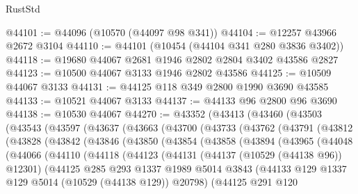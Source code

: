 \begin{lexlean}{RustStd}
\begin{coremodule}
@44101 := @44096 (@10570 (@44097 @98 @341))
@44104 := @12257 @43966 @2672 @3104
@44110 := @44101 (@10454 (@44104 @341 @280 @3836 @3402))
@44118 := @19680 @44067 @2681 @1946 @2802 @2804 @3402 @43586 @2827
@44123 := @10500 @44067 @3133 @1946 @2802 @43586
@44125 := @10509 @44067 @3133
@44131 := @44125 @118 @349 @2800 @1990 @3690 @43585
@44133 := @10521 @44067 @3133
@44137 := @44133 @96 @2800 @96 @3690
@44138 := @10530 @44067
@44270 := @43352
    (@43413
      (@43460
        (@43503
          (@43543
            (@43597
              (@43637
                (@43663
                  (@43700
                    (@43733
                      (@43762
                        (@43791
                          (@43812
                            (@43828
                              (@43842
                                (@43846
                                  (@43850
                                    (@43854
                                      (@43858
                                        (@43894
                                          (@43965
                                            (@44048
                                              (@44066
                                                (@44110
                                                  (@44118
                                                    (@44123
                                                      (@44131
                                                        (@44137 (@10529 (@44138 @96)) @12301)
                                                        (@44125
                                                          @285
                                                          @293
                                                          @1337
                                                          @1989
                                                          @5014
                                                          @3843
                                                          (@44133
                                                            @129
                                                            @1337
                                                            @129
                                                            @5014
                                                            (@10529 (@44138 @129))
                                                            @20798)
                                                          (@44125
                                                            @291
                                                            @120

\end{coremodule}
\end{lexlean}
